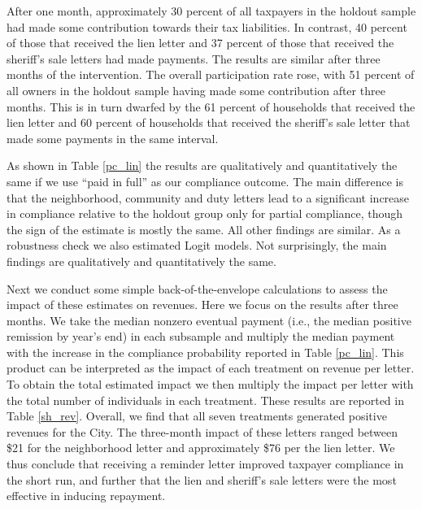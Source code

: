 \documentclass[12pt]{article}
\begin{document}
After one month, approximately 30 percent of all taxpayers in the
holdout sample had made some contribution towards their tax
liabilities. In contrast, 40 percent of those that received the
lien letter and 37 percent of those that received the sheriff's sale letters had
made payments. The results are similar after three months of the
intervention.  The overall participation rate rose, with 
51 percent of all owners in the holdout sample having
made some contribution after three months. 
This is in turn dwarfed by the 61 percent of
households that received the lien letter and 60 percent of households
that received the sheriff's sale letter that made some payments 
in the same interval.

As shown in Table \ref{pc_lin} the results are qualitatively and
quantitatively the same if we use ``paid in full'' as our compliance
outcome. The main difference is that the neighborhood, community and duty
letters lead to a significant increase in compliance relative to
the holdout group only for partial compliance, though the sign
of the estimate is mostly the same. All other findings are similar. As a robustness check we 
also estimated Logit models.  Not surprisingly, the main findings are qualitatively and 
quantitatively the same.

Next we conduct some simple back-of-the-envelope calculations to assess the
impact of these estimates on revenues. Here we focus on the results after
three months. We take the median nonzero eventual payment (i.e., the median
positive remission by year's end) in each subsample and multiply
the median payment with the increase in the compliance probability
reported in Table \ref{pc_lin}. This product can be interpreted as the
impact of each treatment on revenue per letter. To obtain the total
estimated impact we then multiply the impact per letter with the total
number of individuals in each treatment. These results are reported in Table
\ref{sh_rev}.  Overall, we find that all seven treatments
generated positive revenues for the City.  The three-month impact of
these letters ranged between \$21 for the neighborhood letter and
approximately \$76 per the lien letter. We thus conclude that
receiving a reminder letter improved taxpayer compliance in the short
run, and further that the lien and sheriff's sale letters were 
the most effective in inducing repayment.
\end{document}
